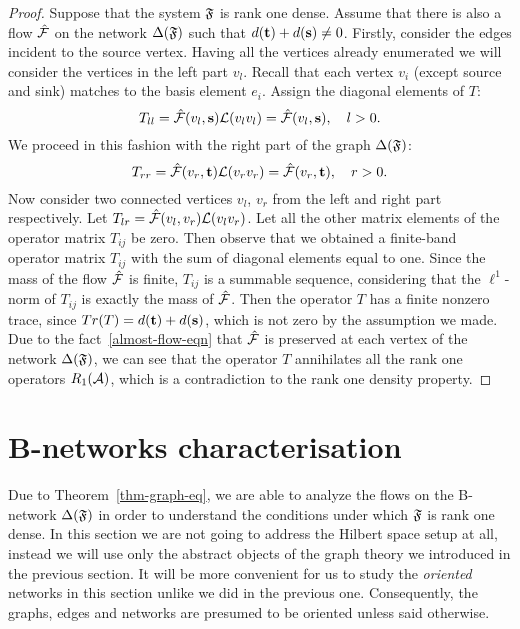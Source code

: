 \documentclass[12pt,oneside,a4paper]{amsart}
\begin{document}
\begin{proof}
        Suppose that the system $\fsys$ is rank one dense.
        Assume that there is also a flow $\flow$ on the network $\net(\fsys)$ such that $d(\sink) + d(\source) \neq 0$.
        Firstly, consider the edges incident to the source vertex.
        Having all the vertices already enumerated we will consider the vertices in the left part $v_{l}$.
        Recall that each vertex $v_i$ (except source and sink) matches to the basis element $e_i$.
        Assign the diagonal elements of $T$:
        \[
          T_{ll} = \flow(v_l, \source) \len(v_l v_l) = \flow(v_l, \source), \quad l > 0.
        \]
        We proceed in this fashion with the right part of the graph $\net(\fsys)$:
        \[
          T_{rr} = \flow(v_r, \sink) \len(v_r v_r) = \flow(v_r, \sink), \quad r > 0.
        \]
        Now consider two connected vertices $v_l$, $v_r$ from the left and right part respectively.
        Let $T_{lr} = \flow(v_l, v_r) \len(v_l  v_r)$.
        Let all the other matrix elements of the operator matrix $T_{ij}$ be zero.
        Then observe that we obtained a finite-band operator matrix $T_{ij}$ with the sum of diagonal elements equal to one.
        Since the mass of the flow $\flow$ is finite, $T_{ij}$ is a summable sequence, considering that
          the $\ell^1$-norm of $T_{ij}$ is exactly the mass of $\flow$.
        Then the operator $T$ has a finite nonzero trace, since $Tr(T) = d(\sink) + d(\source)$, which is not zero
          by the assumption we made.
        Due to the fact~\eqref{almost-flow-eqn} that $\flow$ is preserved at each vertex of the network $\net(\fsys)$,
          we can see that the operator $T$ annihilates all the rank one operators $R_1(\cal{A})$,
          which is a contradiction to the rank one density property.
      \end{proof}

  \bigskip
  \section{B-networks characterisation}
    Due to Theorem~\ref{thm-graph-eq}, we are able to analyze the flows on the B-network
      $\net(\fsys)$ in order to understand the conditions under which $\fsys$ is rank one dense.
    In this section we are not going to address the Hilbert space setup at all,
      instead we will use only the abstract objects of the graph theory we introduced in the previous section.
    It will be more convenient for us to study the \emph{oriented} networks in this section unlike we
      did in the previous one.
    Consequently, the graphs, edges and networks are presumed to be oriented unless said otherwise.
\end{document}
